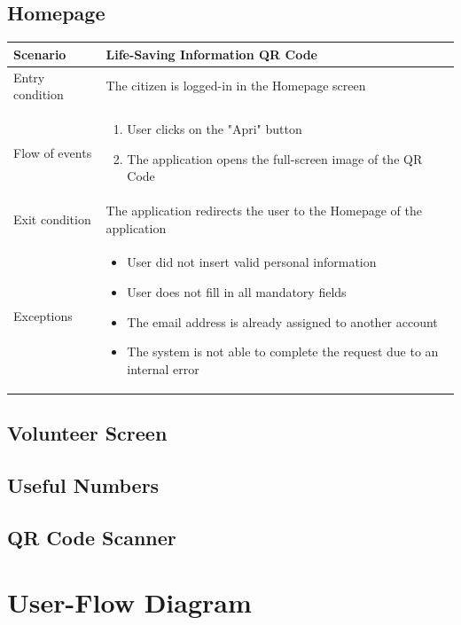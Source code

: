 \documentclass[12pt,a4paper,twoside,openright,titlepage]{book}
\begin{document}
\subsection{Homepage}
\begin{table}[H]
\centering
\begin{tabular}{|p{3cm}|p{10.5cm}|}
\hline
Scenario & Life-Saving Information QR Code \\
\hline
Entry condition & The citizen is logged-in in the Homepage screen\\
\hline
Flow of events & 
\begin{enumerate}
\item User clicks on the "Apri" button
\item The application opens the full-screen image of the QR Code
\end{enumerate}\\
\hline
Exit condition & The application redirects the user to the Homepage of the application \\
\hline
Exceptions & 
\begin{itemize}
\item User did not insert valid personal information
\item User does not fill in all mandatory fields
\item The email address is already assigned to another account
\item The system is not able to complete the request due to an internal error
\end{itemize} \\
\hline
\end{tabular}
\end{table}

\subsection{Volunteer Screen}

\subsection{Useful Numbers}

\subsection{QR Code Scanner}

\section{User-Flow Diagram}
\end{document}
